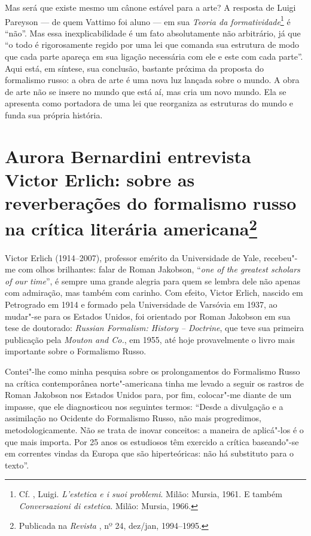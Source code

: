 Mas será que existe mesmo um cânone estável para a arte? A resposta de
Luigi Pareyson --- de quem Vattimo foi aluno
 --- em sua \emph{Teoria da formatividade}\footnote{Cf. , Luigi. 
\emph{L'estetica e i suoi problemi}. Milão: Mursia,
 1961. E também \emph{Conversazioni di estetica}. Milão: Mursia, 1966.}
 é ``não''. Mas essa inexplicabilidade é
um fato absolutamente não arbitrário, já que ``o todo é rigorosamente
regido por uma lei que comanda sua estrutura de modo que cada parte
apareça em sua ligação necessária com ele e este com cada parte''. Aqui
está, em síntese, sua conclusão, bastante próxima da proposta do
formalismo russo: a obra de arte é uma nova luz lançada sobre o mundo. A
obra de arte não se insere no mundo que está aí, mas cria um novo mundo.
Ela se apresenta como portadora de uma lei que reorganiza as estruturas
do mundo e funda sua própria história.

\chapter*{Aurora Bernardini entrevista Victor Erlich: sobre as reverberações do formalismo russo na crítica literária americana\footnote{Publicada na \emph{Revista \protect{}}, nº 24, dez/jan, 1994--1995.}}

\label{erlich}

Victor Erlich (1914--2007), professor emérito da Universidade de Yale, recebeu"-me com
olhos brilhantes: falar de Roman Jakobson, ``\emph{one of the greatest
scholars of our time}'', é sempre uma grande alegria para quem se lembra
dele não apenas com admiração, mas também com carinho.
Com efeito, Victor Erlich, nascido em Petrogrado em 1914 e formado pela
Universidade de Varsóvia em 1937, ao mudar"-se para os Estados Unidos, foi
orientado por Roman Jakobson em sua tese de doutorado: \emph{Russian
Formalism: History -- Doctrine}, que teve sua primeira publicação
pela \emph{Mouton and Co.}, em 1955, até hoje provavelmente o livro
mais importante sobre o Formalismo Russo.

Contei"-lhe como minha pesquisa sobre os prolongamentos do Formalismo
Russo na crítica contemporânea norte"-americana tinha me levado
 a seguir os rastros de Roman Jakobson nos Estados Unidos para,
por fim, colocar"-me diante de um impasse, que ele diagnosticou nos seguintes
termos: ``Desde a divulgação e a assimilação no Ocidente do Formalismo
Russo, não mais progredimos, metodologicamente. Não se trata de inovar
conceitos: a maneira de aplicá"-los é o que mais importa. Por 25 anos os
estudiosos têm exercido a crítica baseando"-se em correntes vindas da
Europa que são hiperteóricas: não há substituto para o texto''.

